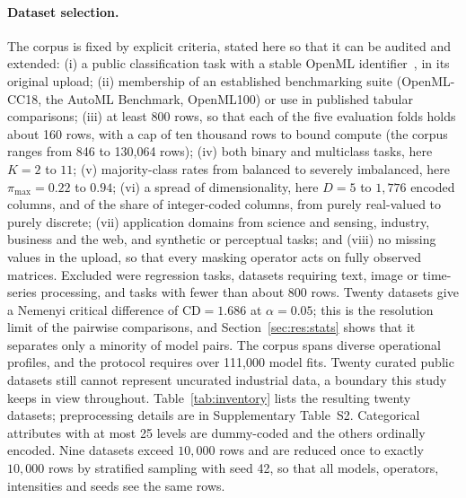\documentclass[pdflatex,sn-mathphys]{sn-jnl}
\theoremstyle{thmstyleone}
\theoremstyle{thmstyletwo}
\theoremstyle{thmstylethree}
\begin{document}
\paragraph{Dataset selection.} The corpus is fixed by explicit criteria, stated here so that it can be audited and extended: (i) a public classification task with a stable OpenML identifier~\cite{bischl2021openml}, in its original upload; (ii) membership of an established benchmarking suite (OpenML-CC18, the AutoML Benchmark, OpenML100) or use in published tabular comparisons; (iii) at least 800 rows, so that each of the five evaluation folds holds about 160 rows, with a cap of ten thousand rows to bound compute (the corpus ranges from 846 to 130{,}064 rows); (iv) both binary and multiclass tasks, here $K=2$ to $11$; (v) majority-class rates from balanced to severely imbalanced, here $\pi_{\max}=0.22$ to $0.94$; (vi) a spread of dimensionality, here $D=5$ to $1{,}776$ encoded columns, and of the share of integer-coded columns, from purely real-valued to purely discrete; (vii) application domains from science and sensing, industry, business and the web, and synthetic or perceptual tasks; and (viii) no missing values in the upload, so that every masking operator acts on fully observed matrices. Excluded were regression tasks, datasets requiring text, image or time-series processing, and tasks with fewer than about 800 rows. Twenty datasets give a Nemenyi critical difference of $\mathrm{CD}=1.686$ at $\alpha=0.05$; this is the resolution limit of the pairwise comparisons, and Section~\ref{sec:res:stats} shows that it separates only a minority of model pairs. The corpus spans diverse operational profiles, and the protocol requires over 111{,}000 model fits. Twenty curated public datasets still cannot represent uncurated industrial data, a boundary this study keeps in view throughout. Table~\ref{tab:inventory} lists the resulting twenty datasets; preprocessing details are in Supplementary Table~S2. Categorical attributes with at most 25 levels are dummy-coded and the others ordinally encoded. Nine datasets exceed $10{,}000$ rows and are reduced once to exactly $10{,}000$ rows by stratified sampling with seed 42, so that all models, operators, intensities and seeds see the same rows.
\end{document}
